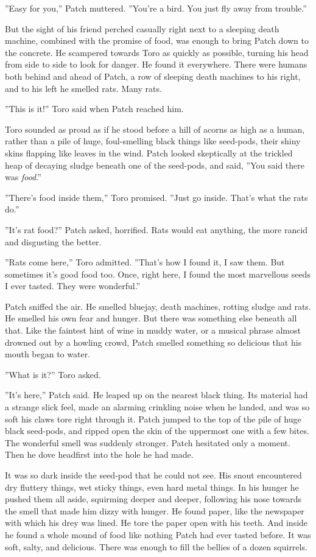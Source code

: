 \documentclass[12pt]{book}
\begin{document}
''Easy for you,'' Patch muttered. ''You're a bird. You just fly away from trouble.''

But the sight of his friend perched casually right next to a sleeping death machine, combined with the promise of food, was enough to bring Patch down to the concrete. He scampered towards Toro as quickly as possible, turning his head from side to side to look for danger. He found it everywhere. There were humans both behind and ahead of Patch, a row of sleeping death machines to his right, and to his left he smelled rats. Many rats.

''This is it!'' Toro said when Patch reached him.

Toro sounded as proud as if he stood before a hill of acorns as high as a human, rather than a pile of huge, foul-smelling black things like seed-pods, their shiny skins flapping like leaves in the wind. Patch looked skeptically at the trickled heap of decaying sludge beneath one of the seed-pods, and said, ''You said there was {\it food}.''

''There's food inside them,'' Toro promised. ''Just go inside. That's what the rats do.''

''It's rat food?'' Patch asked, horrified. Rats would eat anything, the more rancid and disgusting the better.

''Rats come here,'' Toro admitted. ''That's how I found it, I saw them. But sometimes it's good food too. Once, right here, I found the most marvellous seeds I ever tasted. They were wonderful.''

Patch sniffed the air. He smelled bluejay, death machines, rotting sludge and rats. He smelled his own fear and hunger. But there was something else beneath all that. Like the faintest hint of wine in muddy water, or a musical phrase almost drowned out by a howling crowd, Patch smelled something so delicious that his mouth began to water.

''What is it?'' Toro asked.

''It's here,'' Patch said. He leaped up on the nearest black thing. Its material had a strange slick feel, made an alarming crinkling noise when he landed, and was so soft his claws tore right through it. Patch jumped to the top of the pile of huge black seed-pods, and ripped open the skin of the uppermost one with a few bites. The wonderful smell was suddenly stronger. Patch hesitated only a moment. Then he dove headfirst into the hole he had made.

It was so dark inside the seed-pod that he could not see. His snout encountered dry fluttery things, wet sticky things, even hard metal things. In his hunger he pushed them all aside, squirming deeper and deeper, following his nose towards the smell that made him dizzy with hunger. He found paper, like the newspaper with which his drey was lined. He tore the paper open with his teeth. And inside he found a whole mound of food like nothing Patch had ever tasted before. It was soft, salty, and delicious. There was enough to fill the bellies of a dozen squirrels.
\end{document}
